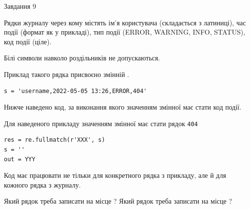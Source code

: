 \documentclass[12pt, ukrainian]{article}
\def\code#1{\Verb!#1!}
\begin{document}
{\begin{minipage}[t]{8.0cm}
\end{minipage}

               
{\begin{center}Завдання {9}\end{center}}
\vspace{-4mm}
Рядки журналу через кому містять ім'я користувача (складається з латиниці), час події (фор\-мат як у прикладі), тип події (ERROR, WARNING, INFO, STATUS), код події (ціле).

Білі символи навколо роздільників не допускаються.

Приклад такого рядка присвоєно змінній .



\begin{verbatim}
s = 'username,2022-05-05 13:26,ERROR,404'
\end{verbatim}


Нижче наведено код, за виконання якого значенням змінної  має стати код події.

Для наведеного прикладу значенням змінної  має стати рядок \code{404}



\begin{verbatim}
res = re.fullmatch(r'XXX', s)
s = ''
out = YYY
\end{verbatim}


Код має працювати не тільки для конкретного рядка з прикладу, але й для кожного рядка з журналу.


Який рядок треба записати на місце  ?
Який рядок треба записати на місце  ?\par

}
\end{document}
